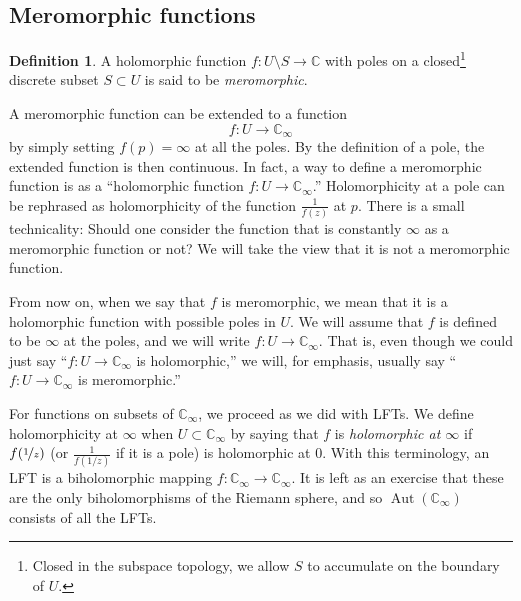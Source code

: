 \documentclass[12pt,openany]{book}
\newcommand{\Aut}{\operatorname{Aut}}
\newcommand{\C}{{\mathbb{C}}}
\newcommand{\myindex}[1]{#1\index{#1}}
\newcommand{\myquote}[1]{``#1''}
\theoremstyle{plain}
\theoremstyle{remark}
\theoremstyle{definition}
\newtheorem{defn}[thm]{Definition}
\theoremstyle{exercise}
\theoremstyle{example}
\begin{document}
\subsection{Meromorphic functions}
\label{subsec:meromorphic}

\begin{defn}
A holomorphic function $f \colon U \setminus S \to \C$ with poles on a
closed\footnote{%
Closed in the subspace topology, we allow $S$ to accumulate
on the boundary of $U$.}
discrete subset $S \subset U$ is said to be \emph{\myindex{meromorphic}}.
\end{defn}

A meromorphic function can be extended to a function
\begin{equation*}
f \colon U \to \C_{\infty}
\end{equation*}
by simply setting $f(p) = \infty$ at all the poles.
By the definition of a pole, the extended function is then continuous.
In fact, a way to define
a meromorphic function is as a
\myquote{holomorphic function $f \colon U \to \C_{\infty}$.}
Holomorphicity at a pole can be
rephrased as holomorphicity of the function $\frac{1}{f(z)}$ at $p$.
There is a small technicality: Should one consider the function
that is constantly $\infty$ as a meromorphic function or not?
We will take the view that it is not a meromorphic function.

From now on, when we say that $f$ is
meromorphic, we mean that it is a holomorphic function with possible
poles in $U$.  We will assume that $f$ is defined to be $\infty$
at the poles, and
we will write $f \colon U \to \C_\infty$.  That is, even though we
could just say \myquote{$f \colon U \to \C_\infty$ is holomorphic,} we will, for emphasis,
usually say \myquote{$f \colon U \to \C_\infty$ is meromorphic.}

For functions on subsets of $\C_\infty$, we proceed as
we did with LFTs.
We define holomorphicity at $\infty$ when $U \subset
\C_\infty$ by saying that $f$ is \emph{\myindex{holomorphic at $\infty$}}
if $f(\nicefrac{1}{z})$ (or $\frac{1}{f(1/z)}$ if it is a pole)
is holomorphic at $0$.
With this terminology, an LFT is a biholomorphic mapping $f \colon
\C_\infty \to \C_\infty$.  It is left as an exercise that
these are the only biholomorphisms of the Riemann sphere, and so
$\Aut(\C_\infty)$ consists of all the LFTs.
\end{document}

